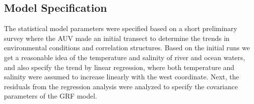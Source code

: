 \documentclass[aoas]{imsart}
\begin{document}
\subsection{Model Specification}
\label{sec:exp_modeling}

The statistical model parameters were specified based on a short
preliminary survey where the AUV made an initial transect to determine
the trends in environmental conditions and correlation
structures. Based on the initial runs we get a reasonable idea of the temperature and salinity of river and ocean waters, and also specify the trend by linear regression, where both temperature and salinity were assumed to increase linearly with the west coordinate. Next, the residuals from the regression analysis were analyzed to specify the covariance parameters of the GRF model.
\end{document}
